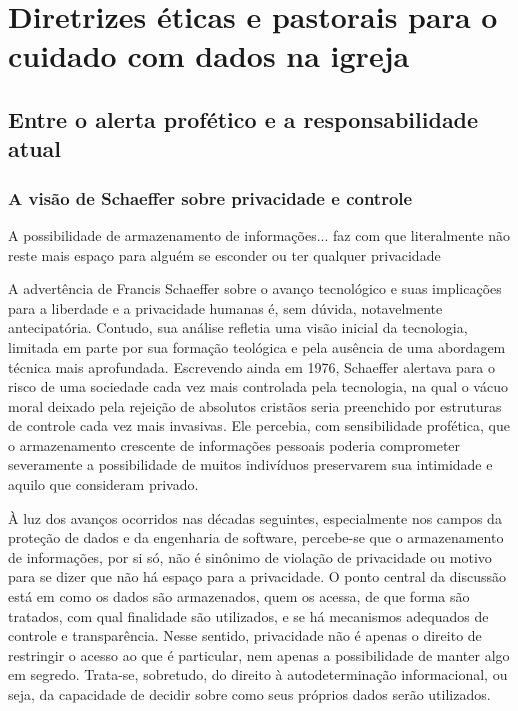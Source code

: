 \chapter{Diretrizes éticas e pastorais para o cuidado com dados na igreja}
\section{Entre o alerta profético e a responsabilidade atual}

\subsection{A visão de Schaeffer sobre privacidade e controle}

\begin{citacao}
    A possibilidade de armazenamento de informações... faz com que literalmente não reste mais espaço para alguém se esconder ou ter qualquer privacidade\cite[p.~165]{schaeffer2002}
\end{citacao}

A advertência de Francis Schaeffer sobre o avanço tecnológico e suas implicações para a liberdade e a privacidade humanas é, sem dúvida, notavelmente antecipatória. Contudo, sua análise refletia uma visão inicial da tecnologia, limitada em parte por sua formação teológica e pela ausência de uma abordagem técnica mais aprofundada. Escrevendo ainda em 1976, Schaeffer alertava para o risco de uma sociedade cada vez mais controlada pela tecnologia, na qual o vácuo moral deixado pela rejeição de absolutos cristãos seria preenchido por estruturas de controle cada vez mais invasivas. Ele percebia, com sensibilidade profética, que o armazenamento crescente de informações pessoais poderia comprometer severamente a possibilidade de muitos indivíduos preservarem sua intimidade e aquilo que consideram privado.

À luz dos avanços ocorridos nas décadas seguintes, especialmente nos campos da proteção de dados e da engenharia de software, percebe-se que o armazenamento de informações, por si só, não é sinônimo de violação de privacidade ou motivo para se dizer que não há espaço para a privacidade. O ponto central da discussão está em como os dados são armazenados, quem os acessa, de que forma são tratados, com qual finalidade são utilizados, e se há mecanismos adequados de controle e transparência. Nesse sentido, privacidade não é apenas o direito de restringir o acesso ao que é particular, nem apenas a possibilidade de manter algo em segredo. Trata-se, sobretudo, do direito à autodeterminação informacional, ou seja, da capacidade de decidir sobre como seus próprios dados serão utilizados.

